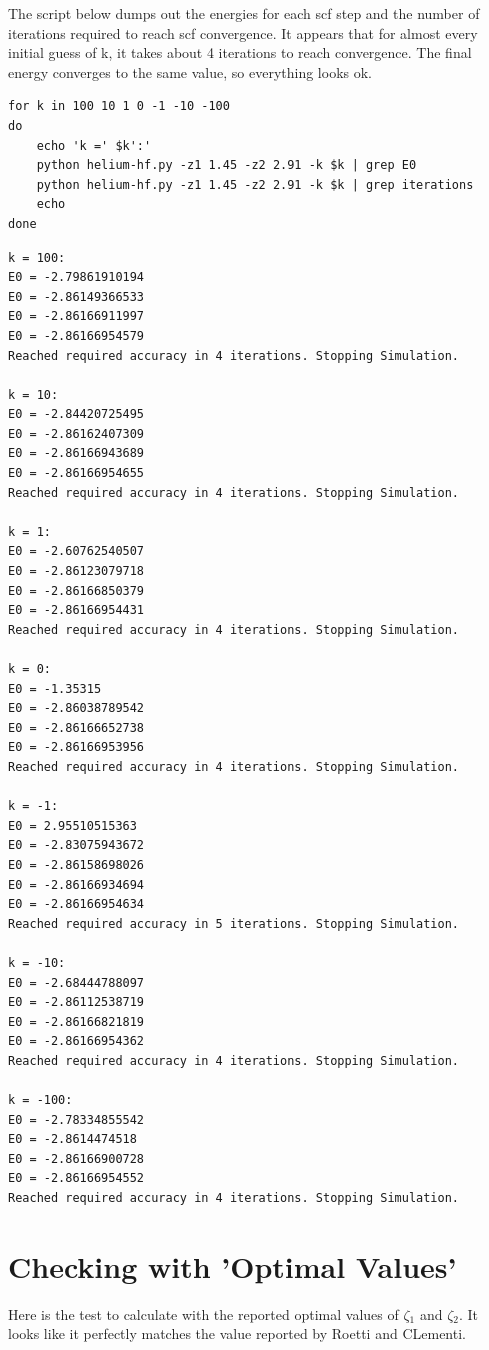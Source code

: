 \documentclass[11pt]{article}
\begin{document}
The script below dumps out the energies for each scf step and the number of iterations required to reach scf convergence. It appears that for almost every initial guess of k, it takes about 4 iterations to reach convergence. The final energy converges to the same value, so everything looks ok.

\begin{verbatim}
for k in 100 10 1 0 -1 -10 -100
do
    echo 'k =' $k':'
    python helium-hf.py -z1 1.45 -z2 2.91 -k $k | grep E0
    python helium-hf.py -z1 1.45 -z2 2.91 -k $k | grep iterations
    echo
done
\end{verbatim}

\begin{verbatim}
k = 100:
E0 = -2.79861910194
E0 = -2.86149366533
E0 = -2.86166911997
E0 = -2.86166954579
Reached required accuracy in 4 iterations. Stopping Simulation.

k = 10:
E0 = -2.84420725495
E0 = -2.86162407309
E0 = -2.86166943689
E0 = -2.86166954655
Reached required accuracy in 4 iterations. Stopping Simulation.

k = 1:
E0 = -2.60762540507
E0 = -2.86123079718
E0 = -2.86166850379
E0 = -2.86166954431
Reached required accuracy in 4 iterations. Stopping Simulation.

k = 0:
E0 = -1.35315
E0 = -2.86038789542
E0 = -2.86166652738
E0 = -2.86166953956
Reached required accuracy in 4 iterations. Stopping Simulation.

k = -1:
E0 = 2.95510515363
E0 = -2.83075943672
E0 = -2.86158698026
E0 = -2.86166934694
E0 = -2.86166954634
Reached required accuracy in 5 iterations. Stopping Simulation.

k = -10:
E0 = -2.68444788097
E0 = -2.86112538719
E0 = -2.86166821819
E0 = -2.86166954362
Reached required accuracy in 4 iterations. Stopping Simulation.

k = -100:
E0 = -2.78334855542
E0 = -2.8614474518
E0 = -2.86166900728
E0 = -2.86166954552
Reached required accuracy in 4 iterations. Stopping Simulation.
\end{verbatim}


\section{Checking with 'Optimal Values'}
\label{sec-5}

Here is the test to calculate with the reported optimal values of $\zeta$$_{\text{1}}$ and $\zeta$$_{\text{2}}$. It looks like it perfectly matches the value reported by Roetti and CLementi.
\end{document}
